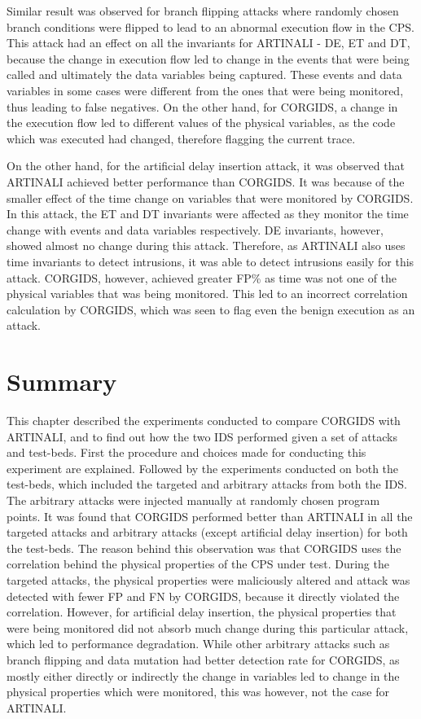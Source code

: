 Similar result was observed for branch flipping attacks where randomly chosen branch conditions were flipped to lead to an abnormal execution flow in the \ac{CPS}. This attack had an effect on all the invariants for ARTINALI -  D\textbar E, E\textbar T and D\textbar T, because the change in execution flow led to change in the events that were being called and ultimately the data variables being captured. These events and data variables in some cases were different from the ones that were being monitored, thus leading to false negatives. On the other hand, for \ac{CORGIDS}, a change in the execution flow led to different values of the physical variables, as the code which was executed had changed, therefore flagging the current trace.

On the other hand, for the artificial delay insertion attack, it was observed that ARTINALI achieved better performance than \ac{CORGIDS}. It was because of the smaller effect of the time change on variables that were monitored by \ac{CORGIDS}. In this attack, the E\textbar T and D\textbar T invariants were affected as they monitor the time change with events and data variables respectively. D\textbar E invariants, however, showed almost no change during this attack. Therefore, as ARTINALI also uses time invariants to detect intrusions, it was able to detect intrusions easily for this attack. \ac{CORGIDS}, however, achieved greater \ac{FP}\% as time was not one of the physical variables that was being monitored. This led to an incorrect correlation calculation by \ac{CORGIDS}, which was seen to flag even the benign execution as an attack.

\section{Summary}
This chapter described the experiments conducted to compare \ac{CORGIDS} with ARTINALI, and to find out how the two \ac{IDS} performed given a set of attacks and test-beds. First the procedure and choices made for conducting this experiment are explained. Followed by the experiments conducted on both the test-beds, which included the targeted and arbitrary attacks from both the \ac{IDS}. The arbitrary attacks were injected manually at randomly chosen program points. It was found that \ac{CORGIDS} performed better than ARTINALI in all the targeted attacks and arbitrary attacks (except artificial delay insertion) for both the test-beds. The reason behind this observation was that \ac{CORGIDS} uses the correlation behind the physical properties of the \ac{CPS} under test. During the targeted attacks, the physical properties were maliciously altered and attack was detected with fewer \ac{FP} and \ac{FN} by \ac{CORGIDS}, because it directly violated the correlation. However, for artificial delay insertion, the physical properties that were being monitored did not absorb much change during this particular attack, which led to performance degradation. While other arbitrary attacks such as branch flipping and data mutation had better detection rate for \ac{CORGIDS}, as mostly either directly or indirectly the change in variables led to change in the physical properties which were monitored, this was however, not the case for ARTINALI.



\endinput
